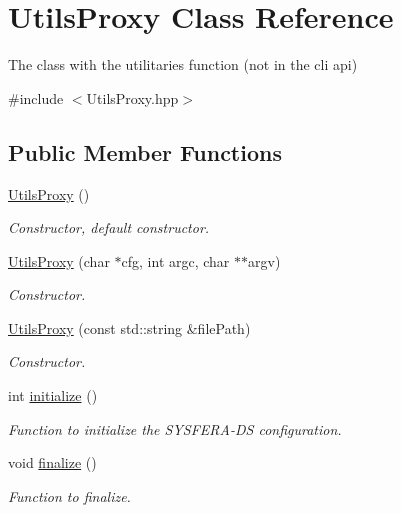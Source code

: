 \hypertarget{classUtilsProxy}{
\section{UtilsProxy Class Reference}
\label{classUtilsProxy}
}


The class with the utilitaries function (not in the cli api)  




{\ttfamily \#include $<$UtilsProxy.hpp$>$}

\subsection*{Public Member Functions}
\begin{DoxyCompactItemize}
\item 
\hypertarget{classUtilsProxy_aaafa5c4ab604c906d313bbeb86fae89d}{
\hyperlink{classUtilsProxy_aaafa5c4ab604c906d313bbeb86fae89d}{UtilsProxy} ()}
\label{classUtilsProxy_aaafa5c4ab604c906d313bbeb86fae89d}

\begin{DoxyCompactList}\small\item\em Constructor, default constructor. \item\end{DoxyCompactList}\item 
\hyperlink{classUtilsProxy_ac5a9f462a23dca72804c9949de07dfb3}{UtilsProxy} (char $\ast$cfg, int argc, char $\ast$$\ast$argv)
\begin{DoxyCompactList}\small\item\em Constructor. \item\end{DoxyCompactList}\item 
\hyperlink{classUtilsProxy_afc7b1c01f7d1129e80d1fe63da23c39c}{UtilsProxy} (const std::string \&filePath)
\begin{DoxyCompactList}\small\item\em Constructor. \item\end{DoxyCompactList}\item 
int \hyperlink{classUtilsProxy_a037ff9b798890eb865cddef7dd9eec94}{initialize} ()
\begin{DoxyCompactList}\small\item\em Function to initialize the SYSFERA-\/DS configuration. \item\end{DoxyCompactList}\item 
void \hyperlink{classUtilsProxy_a2dbe3b111c081b7acf07fcd3e7ee1353}{finalize} ()
\begin{DoxyCompactList}\small\item\em Function to finalize. \item\end{DoxyCompactList}\end{DoxyCompactItemize}
